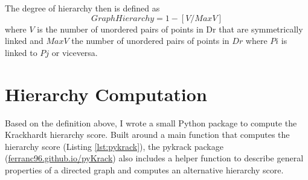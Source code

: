 The degree of hierarchy then is defined as \[Graph Hierarchy = 1 - [V/MaxV]\]
where $V$ is the number of unordered pairs of points in Dr that are symmetrically linked and $MaxV$ the number of unordered pairs of points in $Dr$ where $Pi$ is linked to $Pj$ or viceversa.

\section{Hierarchy Computation}

Based on the definition above, I wrote a small Python package to compute the Krackhardt hierarchy score. Built around a main function that computes the hierarchy score (Listing \ref{lst:pykrack}), the pykrack package (\url{ferranc96.github.io/pyKrack}) also includes a helper function to describe general properties of a directed graph and computes an alternative hierarchy score.

